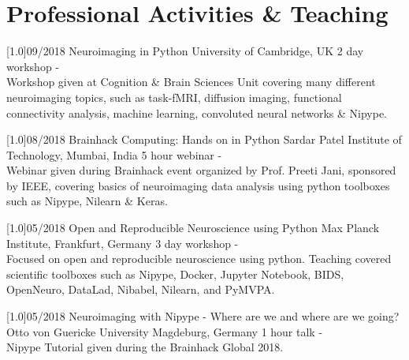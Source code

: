 \documentclass[english]{cv-style}
\begin{document}
\section{Professional Activities \& Teaching}
\begin{talklist}
\talks
  {\scalebox{.8}[1.0]{09/2018}}
  {Neuroimaging in Python}
  {University of Cambridge, UK}
  {2 day workshop - \\
Workshop given at Cognition \& Brain Sciences Unit covering many different neuroimaging topics, such as task-fMRI, diffusion imaging, functional connectivity analysis, machine learning, convoluted neural networks \& Nipype.}
\end{talklist}

\begin{talklist}
\talks
  {\scalebox{.8}[1.0]{08/2018}}
  {Brainhack Computing: Hands on in Python}
  {Sardar Patel Institute of Technology, Mumbai, India}
  {5 hour webinar - \\
Webinar given during Brainhack event organized by Prof. Preeti Jani, sponsored by IEEE, covering basics of neuroimaging data analysis using python toolboxes such as Nipype, Nilearn \& Keras.}
\end{talklist}

\begin{talklist}
\talks
  {\scalebox{.8}[1.0]{05/2018}}
  {Open and Reproducible Neuroscience using Python}
  {Max Planck Institute, Frankfurt, Germany}
  {3 day workshop - \\
Focused on open and reproducible neuroscience using python. Teaching covered scientific toolboxes such as Nipype, Docker, Jupyter Notebook, BIDS, OpenNeuro, DataLad, Nibabel, Nilearn, and PyMVPA.}
\end{talklist}

\begin{talklist}
\talks
  {\scalebox{.8}[1.0]{05/2018}}
  {Neuroimaging with Nipype - Where are we and where are we going?}
  {Otto von Guericke University Magdeburg, Germany}
  {1 hour talk - \\
Nipype Tutorial given during the Brainhack Global 2018.}
\end{talklist}
\end{document}
